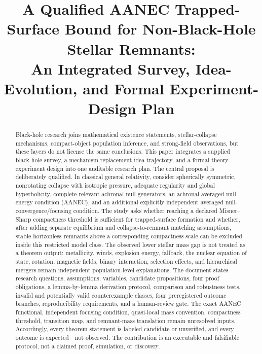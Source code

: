 \documentclass[conference]{IEEEtran}
\begin{document}
\title{A Qualified AANEC Trapped-Surface Bound for Non-Black-Hole Stellar Remnants:\\
An Integrated Survey, Idea-Evolution, and Formal Experiment-Design Plan}

\author{
}

\maketitle

\begin{abstract}
Black-hole research joins mathematical existence statements, stellar-collapse mechanisms, compact-object population inference, and strong-field observations, but these layers do not license the same conclusions. This paper integrates a supplied black-hole survey, a mechanism-replacement idea trajectory, and a formal-theory experiment design into one auditable research plan. The central proposal is deliberately qualified. In classical general relativity, consider spherically symmetric, nonrotating collapse with isotropic pressure, adequate regularity and global hyperbolicity, complete relevant achronal null generators, an achronal averaged null energy condition (AANEC), and an additional explicitly independent averaged null-convergence/focusing condition. The study asks whether reaching a declared Misner--Sharp compactness threshold is sufficient for trapped-surface formation and whether, after adding separate equilibrium and collapse-to-remnant matching assumptions, stable horizonless remnants above a corresponding compactness scale can be excluded inside this restricted model class. The observed lower stellar mass gap is not treated as a theorem output: metallicity, winds, explosion energy, fallback, the nuclear equation of state, rotation, magnetic fields, binary interaction, selection effects, and hierarchical mergers remain independent population-level explanations. The document states research questions, assumptions, variables, candidate propositions, four proof obligations, a lemma-by-lemma derivation protocol, comparison and robustness tests, invalid and potentially valid counterexample classes, four preregistered outcome branches, reproducibility requirements, and a human-review gate. The exact AANEC functional, independent focusing condition, quasi-local mass convention, compactness threshold, transition map, and remnant-mass translation remain unresolved inputs. Accordingly, every theorem statement is labeled candidate or unverified, and every outcome is expected---not observed. The contribution is an executable and falsifiable protocol, not a claimed proof, simulation, or discovery.
\end{abstract}
\end{document}
